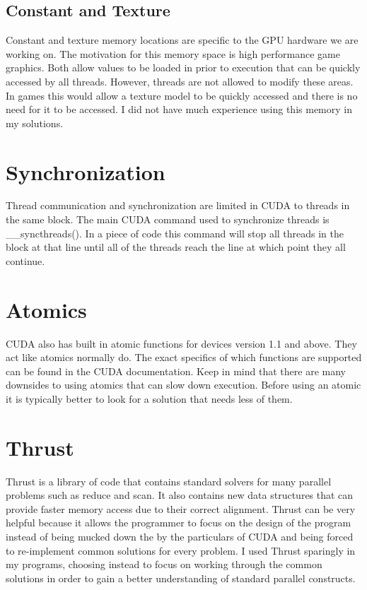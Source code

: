 \documentclass{article}
\newcommand{\comp}[1]{{\ttfamily #1}}
\begin{document}
      \subsection{Constant and Texture}
	  Constant and texture memory locations are specific to the GPU hardware we are working on. The motivation for this memory space is high performance game graphics. Both allow values to be loaded in prior to execution that can be quickly accessed by all threads. However, threads are not allowed to modify these areas. In games this would allow a texture model to be quickly accessed and there is no need for it to be accessed. I did not have much experience using this memory in my solutions.




    \section{Synchronization}
    \label{sec.synchronization}
    Thread communication and synchronization are limited in CUDA to threads in the same block. The main CUDA command used to synchronize threads is \comp{\_\_syncthreads()}. In a piece of code this command will stop all threads in the block at that line until all of the threads reach the line at which point they all continue.

	\section{Atomics}
    CUDA also has built in atomic functions for devices version 1.1 and above. They act like atomics normally do. The exact specifics of which functions are supported can be found in the CUDA documentation. Keep in mind that there are many downsides to using atomics that can slow down execution. Before using an atomic it is typically better to look for a solution that needs less of them.



  \section{Thrust}
  Thrust is a library of code that contains standard solvers for many parallel problems such as reduce and scan. It also contains new data structures that can provide faster memory access due to their correct alignment. Thrust can be very helpful because it allows the programmer to focus on the design of the program instead of being mucked down the by the particulars of CUDA and being forced to re-implement common solutions for every problem. I used Thrust sparingly in my programs, choosing instead to focus on working through the common solutions in order to gain a better understanding of standard parallel constructs.
\end{document}
